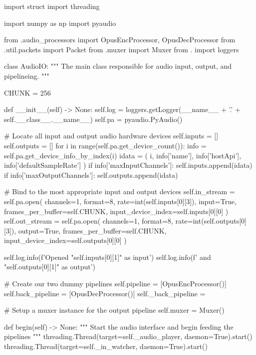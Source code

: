\begin{pythoncode}
import struct
import threading

import numpy as np
import pyaudio

from .audio_processors import OpusEncProcessor, OpusDecProcessor
from .util.packets import Packet
from .muxer import Muxer
from . import loggers


class AudioIO:
    """
    The main class responsible for audio input, output, and pipelineing.
    """

    CHUNK = 256

    def __init__(self) -> None:
        self.log = loggers.getLogger(__name__ + '.' + self.__class__.__name__)
        self.pa = pyaudio.PyAudio()

        # Locate all input and output audio hardware devices
        self.inputs = []
        self.outputs = []
        for i in range(self.pa.get_device_count()):
            info = self.pa.get_device_info_by_index(i)
            idata = (
                i, info['name'], info['hostApi'], info['defaultSampleRate']
            )
            if info['maxInputChannels']:
                self.inputs.append(idata)
            if info['maxOutputChannels']:
                self.outputs.append(idata)

        # Bind to the most appropriate input and output devices
        self.in_stream = self.pa.open(
            channels=1,
            format=8,
            rate=int(self.inputs[0][3]),
            input=True,
            frames_per_buffer=self.CHUNK,
            input_device_index=self.inputs[0][0]
        )
        self.out_stream = self.pa.open(
            channels=1,
            format=8,
            rate=int(self.outputs[0][3]),
            output=True,
            frames_per_buffer=self.CHUNK,
            input_device_index=self.outputs[0][0]
        )

        self.log.info(f'Opened "{self.inputs[0][1]}" as input')
        self.log.info(f'   and "{self.outputs[0][1]}" as output')

        # Create our two dummy pipelines
        self.pipeline = [OpusEncProcessor()]
        self.back_pipeline = [OpusDecProcessor()]
        self._back_pipeline = {}

        # Setup a muxer instance for the output pipeline
        self.muxer = Muxer()

    def begin(self) -> None:
        """
        Start the audio interface and begin feeding the pipelines
        """
        threading.Thread(target=self._audio_player, daemon=True).start()
        threading.Thread(target=self._in_watcher, daemon=True).start()


\end{pythoncode}
